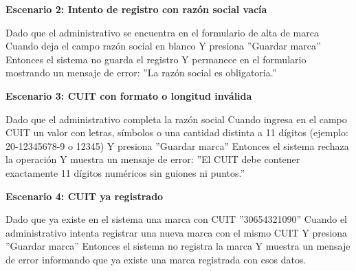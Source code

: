 \documentclass[a4paper,9pt]{article}
\begin{document}
\begin{tcolorbox}[hucard, title={\textbf{HU-240: CREAR MARCA} \hfill \scriptsize \colorbox{slatestatus}{\textbf{\ Done\ }} \quad \colorbox{white}{\textcolor{primarydark}{\textbf{\ 3 pts\ }}}}]
{\noindent\textbf{\textcolor{secondarydark}{Escenario 2:  Intento de registro con razón social vacía}}\par\vspace{1pt}
Dado que el administrativo se encuentra en el formulario de alta de marca Cuando deja el campo razón social en blanco Y presiona ''Guardar marca'' Entonces el sistema no guarda el registro Y permanece en el formulario mostrando un mensaje de error: ''La razón social es obligatoria.''\par\vspace{2.5pt}
\noindent\textbf{\textcolor{secondarydark}{Escenario 3:  CUIT con formato o longitud inválida}}\par\vspace{1pt}
Dado que el administrativo completa la razón social Cuando ingresa en el campo CUIT un valor con letras, símbolos o una cantidad distinta a 11 dígitos (ejemplo: 20-12345678-9 o 12345) Y presiona ''Guardar marca'' Entonces el sistema rechaza la operación Y muestra un mensaje de error: ''El CUIT debe contener exactamente 11 dígitos numéricos sin guiones ni puntos.''\par\vspace{2.5pt}
\noindent\textbf{\textcolor{secondarydark}{Escenario 4:  CUIT ya registrado}}\par\vspace{1pt}
Dado que ya existe en el sistema una marca con CUIT ''30654321090'' Cuando el administrativo intenta registrar una nueva marca con el mismo CUIT Y presiona ''Guardar marca'' Entonces el sistema no registra la marca Y muestra un mensaje de error informando que ya existe una marca registrada con esos datos.\par\vspace{2.5pt}
}\par
\end{tcolorbox}
\end{document}
